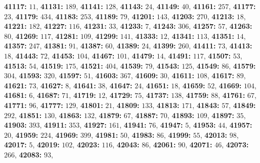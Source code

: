 \textsf{\bfseries 41117:} $11$, \textsf{\bfseries 41131:} $189$, \textsf{\bfseries 41141:} $128$, \textsf{\bfseries 41143:} $24$, \textsf{\bfseries 41149:} $40$, \textsf{\bfseries 41161:} $257$, \textsf{\bfseries 41177:} $23$, \textsf{\bfseries 41179:} $434$, \textsf{\bfseries 41183:} $253$, \textsf{\bfseries 41189:} $79$, \textsf{\bfseries 41201:} $143$, \textsf{\bfseries 41203:} $270$, \textsf{\bfseries 41213:} $18$, \textsf{\bfseries 41221:} $182$, \textsf{\bfseries 41227:} $116$, \textsf{\bfseries 41231:} $33$, \textsf{\bfseries 41233:} $7$, \textsf{\bfseries 41243:} $306$, \textsf{\bfseries 41257:} $57$, \textsf{\bfseries 41263:} $80$, \textsf{\bfseries 41269:} $117$, \textsf{\bfseries 41281:} $109$, \textsf{\bfseries 41299:} $141$, \textsf{\bfseries 41333:} $12$, \textsf{\bfseries 41341:} $113$, \textsf{\bfseries 41351:} $14$, \textsf{\bfseries 41357:} $247$, \textsf{\bfseries 41381:} $91$, \textsf{\bfseries 41387:} $60$, \textsf{\bfseries 41389:} $24$, \textsf{\bfseries 41399:} $260$, \textsf{\bfseries 41411:} $73$, \textsf{\bfseries 41413:} $18$, \textsf{\bfseries 41443:} $72$, \textsf{\bfseries 41453:} $104$, \textsf{\bfseries 41467:} $101$, \textsf{\bfseries 41479:} $14$, \textsf{\bfseries 41491:} $117$, \textsf{\bfseries 41507:} $53$, \textsf{\bfseries 41513:} $54$, \textsf{\bfseries 41519:} $175$, \textsf{\bfseries 41521:} $404$, \textsf{\bfseries 41539:} $79$, \textsf{\bfseries 41543:} $125$, \textsf{\bfseries 41549:} $86$, \textsf{\bfseries 41579:} $304$, \textsf{\bfseries 41593:} $320$, \textsf{\bfseries 41597:} $51$, \textsf{\bfseries 41603:} $367$, \textsf{\bfseries 41609:} $30$, \textsf{\bfseries 41611:} $108$, \textsf{\bfseries 41617:} $89$, \textsf{\bfseries 41621:} $73$, \textsf{\bfseries 41627:} $8$, \textsf{\bfseries 41641:} $38$, \textsf{\bfseries 41647:} $24$, \textsf{\bfseries 41651:} $18$, \textsf{\bfseries 41659:} $52$, \textsf{\bfseries 41669:} $104$, \textsf{\bfseries 41681:} $6$, \textsf{\bfseries 41687:} $71$, \textsf{\bfseries 41719:} $12$, \textsf{\bfseries 41729:} $75$, \textsf{\bfseries 41737:} $138$, \textsf{\bfseries 41759:} $88$, \textsf{\bfseries 41761:} $67$, \textsf{\bfseries 41771:} $96$, \textsf{\bfseries 41777:} $129$, \textsf{\bfseries 41801:} $21$, \textsf{\bfseries 41809:} $133$, \textsf{\bfseries 41813:} $171$, \textsf{\bfseries 41843:} $57$, \textsf{\bfseries 41849:} $292$, \textsf{\bfseries 41851:} $130$, \textsf{\bfseries 41863:} $132$, \textsf{\bfseries 41879:} $67$, \textsf{\bfseries 41887:} $70$, \textsf{\bfseries 41893:} $109$, \textsf{\bfseries 41897:} $35$, \textsf{\bfseries 41903:} $393$, \textsf{\bfseries 41911:} $353$, \textsf{\bfseries 41927:} $161$, \textsf{\bfseries 41941:} $76$, \textsf{\bfseries 41947:} $5$, \textsf{\bfseries 41953:} $44$, \textsf{\bfseries 41957:} $20$, \textsf{\bfseries 41959:} $224$, \textsf{\bfseries 41969:} $399$, \textsf{\bfseries 41981:} $50$, \textsf{\bfseries 41983:} $86$, \textsf{\bfseries 41999:} $55$, \textsf{\bfseries 42013:} $98$, \textsf{\bfseries 42017:} $5$, \textsf{\bfseries 42019:} $102$, \textsf{\bfseries 42023:} $116$, \textsf{\bfseries 42043:} $86$, \textsf{\bfseries 42061:} $90$, \textsf{\bfseries 42071:} $46$, \textsf{\bfseries 42073:} $266$, \textsf{\bfseries 42083:} $93$, 
